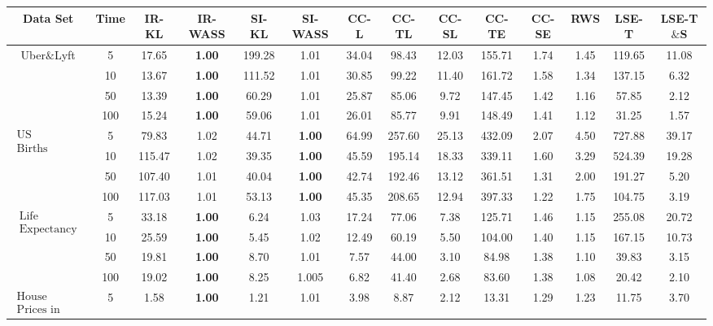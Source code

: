 \documentclass{article}
\begin{document}
\begin{table*}[h!]
    \centering
    \scriptsize
    \begin{tabular}{||c|c|c|c|c|c|c|c|c|c|c|c|c|c||}
    \hline
    \hline
    Data Set&Time &IR-KL &IR-WASS &SI-KL &SI-WASS & CC-L &CC-TL &CC-SL & CC-TE &CC-SE &RWS &LSE-T &LSE-T$\&$S \\
    \hline
    \hline
    \multirow{4}{*}{Uber$\&$Lyft} 
    &5 &17.65	&\textbf{1.00}	&199.28 &1.01 &34.04 &98.43 &12.03 &155.71 &1.74 &1.45 &119.65 &11.08\\
    &10 &13.67 &\textbf{1.00} &111.52 &1.01 &30.85 &99.22 & 11.40 &161.72 &1.58 &1.34 &137.15 &6.32 \\
    &50 &13.39 &\textbf{1.00}	&60.29 &1.01 &25.87 &	85.06 &9.72 &147.45 &1.42 &1.16 &57.85 &2.12\\
    &100 &15.24 &\textbf{1.00}	&59.06 &1.01 &26.01 &	85.77 &9.91 &148.49 &1.41 &1.12 &31.25 &1.57 \\
    \hline
    \hline
    \multirow{4}{*}{$\substack{\text{US}\\ \text{Births (2018)}}$}
    &5 &79.83 &1.02 &44.71 &\textbf{1.00}	&64.99 &	257.60 &25.13 &432.09 &2.07 &4.50 &727.88 &39.17 \\
    &10 & 115.47 &1.02 &39.35 &\textbf{1.00} &45.59 &195.14 &18.33 &339.11 &1.60 &3.29 &524.39 &19.28\\
    &50 &107.40 &1.01 &40.04 &\textbf{1.00}	 &42.74 &	192.46 &13.12 &361.51 &1.31 &2.00 &191.27 &5.20\\
    &100 &117.03 &1.01 &53.13 &\textbf{1.00} &45.35 &	208.65 &12.94 &397.33 &1.22 &1.75 &104.75 &3.19\\
    \hline
    \hline
    \multirow{4}{*}{$\substack{\text{Life}\\ \text{Expectancy}}$}  
    &5 &33.18 &\textbf{1.00} &6.24 &1.03 &17.24 &77.06 &7.38 &125.71 &1.46 &1.15 &255.08 &20.72\\
    &10 &25.59 &\textbf{1.00}	&5.45 &1.02 &12.49 &60.19 &5.50 &104.00 &1.40 &1.15 &167.15 &10.73\\
    &50 &19.81 &\textbf{1.00}	&8.70 &1.01 &7.57 &44.00 &3.10 &84.98 &1.38 &1.10 &39.83 &3.15\\
    &100 &19.02 &\textbf{1.00}	&8.25 &1.005 &6.82 &41.40 &2.68 &83.60 &1.38 &1.08 &20.42 &2.10  \\
    \hline
    \hline
    \multirow{4}{*}{$\substack{\text{House}\\ \text{Prices in KC}}$}  
    &5 &1.58 &\textbf{1.00}	&1.21 &1.01 &3.98 &8.87 &2.12 &13.31 &1.29 &1.23 &11.75 &3.70\\

\end{tabular}
\end{table*}
\end{document}
